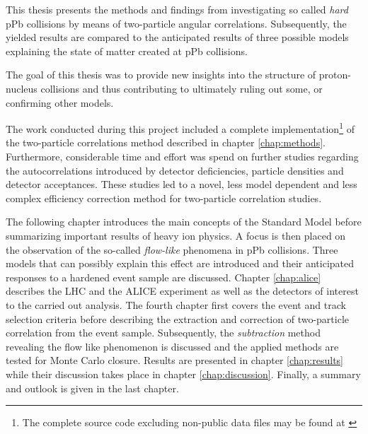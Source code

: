 This thesis presents the methods and findings from investigating so called \emph{hard} pPb collisions by means of two-particle angular correlations. Subsequently, the yielded results are compared to the anticipated results of three possible models explaining the state of matter created at pPb collisions.

The goal of this thesis was to provide new insights into the structure of proton-nucleus collisions and thus contributing to ultimately ruling out some, or confirming other models.

The work conducted during this project included a complete implementation\footnote{The complete source code excluding non-public data files may be found at \cite{Bourjau2014}} of the two-particle correlations method described in chapter \ref{chap:methods}. Furthermore, considerable time and effort was spend on further studies regarding the autocorrelations introduced by detector deficiencies, particle densities and detector acceptances. These studies led to a novel, less model dependent and less complex efficiency correction method for two-particle correlation studies.

The following chapter introduces the main concepts of the Standard Model before summarizing important results of heavy ion physics. A focus is then placed on the observation of the so-called \emph{flow-like} phenomena in pPb collisions. Three models that can possibly explain this effect are introduced and their anticipated responses to a hardened event sample are discussed. Chapter \ref{chap:alice} describes the LHC and the ALICE experiment as well as the detectors of interest to the carried out analysis. The fourth chapter first covers the event and track selection criteria before describing the extraction and correction of two-particle correlation from the event sample. Subsequently, the \emph{subtraction} method revealing the flow like phenomenon is discussed and the applied methods are tested for Monte Carlo closure. Results are presented in chapter \ref{chap:results} while their discussion takes place in chapter \ref{chap:discussion}. Finally, a summary and outlook is given in the last chapter.



